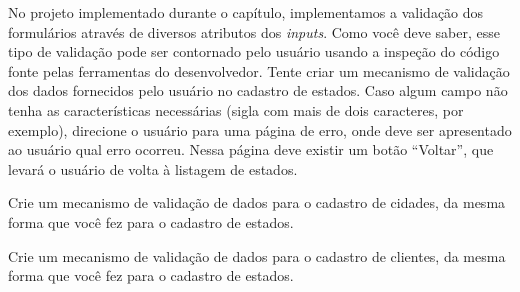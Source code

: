 \begin{projetoSemArquivo}{}{}{}
    No projeto implementado durante o capítulo, implementamos a validação dos formulários através de diversos atributos dos \textit{inputs}. Como você deve saber, esse tipo de validação pode ser contornado pelo usuário usando a inspeção do código fonte pelas ferramentas do desenvolvedor. Tente criar um mecanismo de validação dos dados fornecidos pelo usuário no cadastro de estados. Caso algum campo não tenha as características necessárias (sigla com mais de dois caracteres, por exemplo), direcione o usuário para uma página de erro, onde deve ser apresentado ao usuário qual erro ocorreu. Nessa página deve existir um botão ``Voltar'', que levará o usuário de volta à listagem de estados.
\end{projetoSemArquivo}

\begin{projetoSemArquivo}{}{}{}
    Crie um mecanismo de validação de dados para o cadastro de cidades, da mesma forma que você fez para o cadastro de estados.
\end{projetoSemArquivo}

\begin{projetoSemArquivo}{}{}{}
    Crie um mecanismo de validação de dados para o cadastro de clientes, da mesma forma que você fez para o cadastro de estados.
\end{projetoSemArquivo}